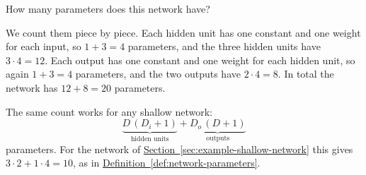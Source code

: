 \documentclass[a4paper,12pt,oneside]{report}
\begin{document}
\begin{framedexercise}{}\label{ex:count-parameters}
How many parameters does this network have?
\end{framedexercise}

We count them piece by piece. Each hidden unit has one constant and
one weight for each input, so $1+3=4$ parameters, and the three hidden
units have $3\cdot4=12$. Each output has one constant and one weight for
each hidden unit, so again $1+3=4$ parameters, and the two outputs have
$2\cdot4=8$. In total the network has $12+8=20$ parameters.

The same count works for any shallow network:
\[
  \underbrace{D\,(D_i+1)}_{\text{hidden units}}
  +\underbrace{D_o\,(D+1)}_{\text{outputs}}
\]
parameters. For the network of
\hyperref[sec:example-shallow-network]{Section~\ref*{sec:example-shallow-network}}
this gives $3\cdot2+1\cdot4=10$, as in
\hyperref[def:network-parameters]{Definition~\ref*{def:network-parameters}}.
\end{document}

